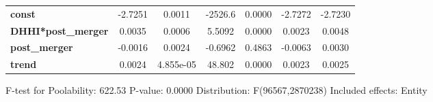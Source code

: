 \documentclass{report}
\begin{document}
\begin{center}
\begin{tabular}{lcccccc}
\midrule
\textbf{const}             &      -2.7251       &       0.0011       &     -2526.6     &      0.0000      &      -2.7272      &      -2.7230       \\
\textbf{DHHI*post\_merger} &       0.0035       &       0.0006       &      5.5092     &      0.0000      &       0.0023      &       0.0048       \\
\textbf{post\_merger}      &      -0.0016       &       0.0024       &     -0.6962     &      0.4863      &      -0.0063      &       0.0030       \\
\textbf{trend}             &       0.0024       &     4.855e-05      &      48.802     &      0.0000      &       0.0023      &       0.0025       \\
\bottomrule
\end{tabular}
\end{center}

F-test for Poolability: 622.53 \newline
 P-value: 0.0000 \newline
 Distribution: F(96567,2870238) \newline
  \newline
 Included effects: Entity
\end{document}
